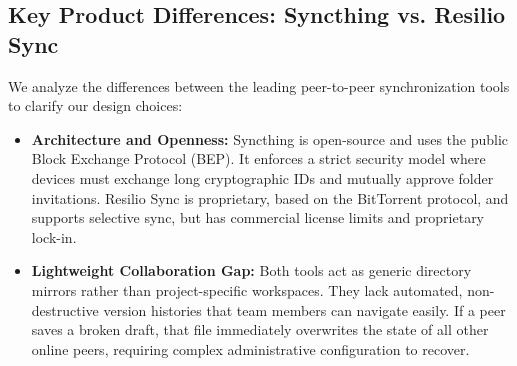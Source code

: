 \subsection{Key Product Differences: Syncthing vs. Resilio Sync}
We analyze the differences between the leading peer-to-peer synchronization tools to clarify our design choices:
\begin{itemize}
    \item \textbf{Architecture and Openness:} Syncthing is open-source and uses the public Block Exchange Protocol (BEP). It enforces a strict security model where devices must exchange long cryptographic IDs and mutually approve folder invitations. Resilio Sync is proprietary, based on the BitTorrent protocol, and supports selective sync, but has commercial license limits and proprietary lock-in.
    \item \textbf{Lightweight Collaboration Gap:} Both tools act as generic directory mirrors rather than project-specific workspaces. They lack automated, non-destructive version histories that team members can navigate easily. If a peer saves a broken draft, that file immediately overwrites the state of all other online peers, requiring complex administrative configuration to recover.
\end{itemize}


